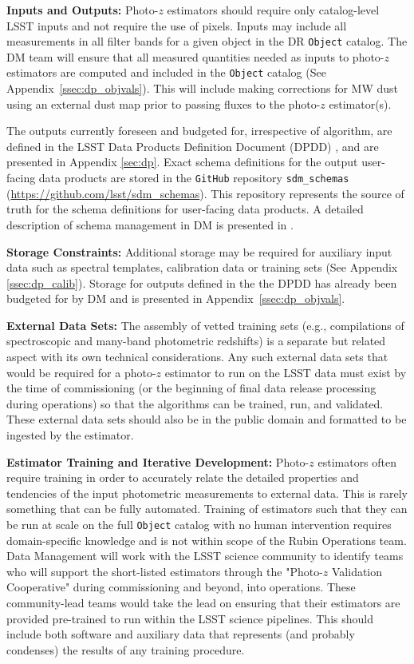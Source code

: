 \documentclass[DM,authoryear,toc]{lsstdoc}
\begin{document}
\textbf{Inputs and Outputs:}
Photo-$z$ estimators should require only catalog-level LSST inputs and not require the use of pixels. 
Inputs may include all measurements in all filter bands for a given object in the DR {\tt Object} catalog. 
The DM team will ensure that all measured quantities needed as inputs to photo-$z$ estimators are computed and included in the {\tt Object} catalog (See Appendix~\ref{ssec:dp_objvals}).
This will include making corrections for MW dust using an external dust map prior to passing fluxes to the photo-$z$ estimator(s).

The outputs currently foreseen and budgeted for, irrespective of algorithm, are defined in the LSST Data Products Definition Document (DPDD) \cite{LSE-163}, and are presented in Appendix \ref{sec:dp}. 
Exact schema definitions for the output user-facing data products are stored in the {\tt GitHub} repository {\tt sdm\_schemas} (\url{https://github.com/lsst/sdm\_schemas}). 
This repository represents the source of truth for the schema definitions for user-facing data products.
A detailed description of schema management in DM is presented in \cite{dmtn-153}. 

\textbf{Storage Constraints:}
Additional storage may be required for auxiliary input data such as spectral templates, calibration data or training sets (See Appendix \ref{ssec:dp_calib}). 
Storage for outputs defined in the the DPDD \cite{LSE-163} has already been budgeted for by DM and is presented in Appendix~\ref{ssec:dp_objvals}. 

\textbf{External Data Sets:}
The assembly of vetted training sets (e.g., compilations of spectroscopic and many-band photometric redshifts) is a separate but related aspect with its own technical considerations.
Any such external data sets that would be required for a photo-$z$ estimator to run on the LSST data must exist by the time of commissioning (or the beginning of final data release processing during operations) so that the algorithms can be trained, run, and validated.
These external data sets should also be in the public domain and formatted to be ingested by the estimator.

\textbf{Estimator Training and Iterative Development:}
Photo-$z$ estimators often require training in order to accurately relate the detailed properties and tendencies of the input photometric measurements to external data.
This is rarely something that can be fully automated.
Training of estimators such that they can be run at scale on the full {\tt Object} catalog with no human intervention requires domain-specific knowledge and is not within scope of the Rubin Operations team. 
Data Management will work with the LSST science community to identify teams who will support the short-listed estimators through the "Photo-$z$ Validation Cooperative" during commissioning and beyond, into operations.
These community-lead teams would take the lead on ensuring that their estimators are provided pre-trained to run within the LSST science pipelines. 
This should include both software and auxiliary data that represents (and probably condenses) the results of any training procedure.
\end{document}
